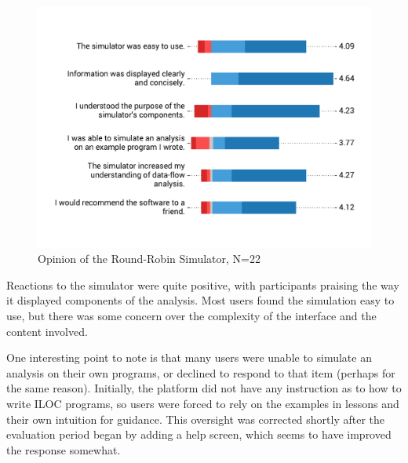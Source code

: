 \documentclass[bsc,twoside,singlespacing,parskip,logo,notimes,normalheadings]{infthesis}
\begin{document}
    \begin{figure}[!hb]
      \centering
      \captionsetup{width=\textwidth, justification=centering}
      \caption{Opinion of the Round-Robin Simulator, N=22}\label{fig:opinion-simulator}
      \includegraphics[width=\textwidth, trim=0 40 0 40, clip]{img/simulator_opinion.pdf}
    \end{figure}

    Reactions to the simulator were quite positive, with participants
    praising the way it displayed components of the analysis. Most
    users found the simulation easy to use, but there was some concern
    over the complexity of the interface and the content involved.

    One interesting point to note is that many users were unable to
    simulate an analysis on their own programs, or declined to respond
    to that item (perhaps for the same reason). Initially, the
    platform did not have any instruction as to how to write ILOC
    programs, so users were forced to rely on the examples in lessons
    and their own intuition for guidance. This oversight was corrected
    shortly after the evaluation period began by adding a help screen,
    which seems to have improved the response somewhat.
\end{document}
